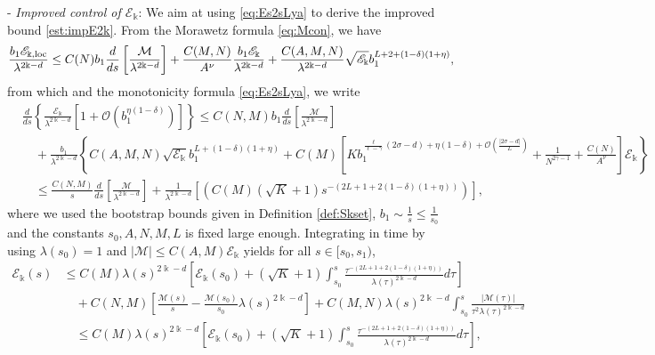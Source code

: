 \documentclass[11pt]{aims}
\theoremstyle{definition}
\numberwithin{equation}{section}
\begin{document}
\noindent - \textit{Improved control of ${\mathscr{E}}_{\Bbbk}$}: We aim at using \eqref{eq:Es2sLya} to derive the improved bound \eqref{est:impE2k}. From the Morawetz formula \eqref{eq:Mcon}, we have 
$$\frac{b_1 {\mathscr{E}}_{\Bbbk, \textup{loc}}}{\lambda^{2\Bbbk - d}} \leq C(N)b_1 \frac{d}{ds}\left[\frac{\mathcal{M}}{\lambda^{2\Bbbk - d}}\right] + \frac{C(M,N)}{A^\nu}\frac{b_1{\mathscr{E}}_\Bbbk}{\lambda^{2\Bbbk - d}} + \frac{C(A, M, N)}{\lambda^{2\Bbbk - d}} \sqrt{{\mathscr{E}}_\Bbbk}b_1^{L + 2 + (1 - \delta)(1 + \eta)},$$
from which and the monotonicity formula \eqref{eq:Es2sLya}, we write
\begin{align*}
&\frac{d}{ds} \left\{\frac{{\mathscr{E}}_\Bbbk}{\lambda^{2\Bbbk - d}} \left[1 + {\mathcal{O}}(b_1^{\eta(1 - \delta)})\right]\right\} \leq C(N,M)b_1 \frac{d}{ds}\left[\frac{\mathcal{M}}{\lambda^{2\Bbbk - d}}\right]\\
&\quad + \frac{b_1}{\lambda^{2\Bbbk - d}}\left\{C(A, M, N)\sqrt{{\mathscr{E}}_\Bbbk} b_1^{L + (1 - \delta)(1 + \eta)} + C(M) \left[K b_1^{\frac{\ell}{\ell - \gamma}(2\sigma - d) + \eta(1 - \delta) + {\mathcal{O}}\left(\frac{|2\sigma  - d|}{L}\right)} + \frac{1}{N^{2\gamma - 1}} + \frac{C(N)}{A^\nu} \right]{\mathscr{E}}_\Bbbk \right\} \\
& \quad \leq \frac{C(N,M)}{s} \frac{d}{ds}\left[\frac{\mathcal{M}}{\lambda^{2\Bbbk - d}}\right] + \frac{1}{\lambda^{2\Bbbk - d}} \left[ \left(C(M)(\sqrt{K} + 1)s^{-(2L  +1 + 2(1 - \delta)(1 + \eta))} \right) \right],
\end{align*}
where we used the bootstrap bounds given in Definition \ref{def:Skset}, $b_1 \sim \frac{1}{s} \leq \frac{1}{s_0}$ and the constants $s_0, A, N, M, L$ is fixed large enough. Integrating in time by using $\lambda(s_0) = 1$ and $|{\mathcal{M}}| \leq C(A,M){\mathscr{E}}_\Bbbk$ yields for all $s \in [s_0, s_1)$,
\begin{align*}
{\mathscr{E}}_{\Bbbk}(s) &\leq C(M) \lambda(s)^{2\Bbbk - d}\left[{\mathscr{E}}_{\Bbbk}(s_0) + \left(\sqrt K +  1\right)\int_{s_0}^s\frac{\tau^{-(2L + 1 + 2(1 - \delta)(1 + \eta))}}{\lambda(\tau)^{2\Bbbk - d}}d\tau\right]\\
& \quad + C(N,M)\left[\frac{{\mathcal{M}}(s)}{s} - \frac{{\mathcal{M}}(s_0)}{s_0} \lambda(s)^{2\Bbbk - d} \right] + C(M,N)\lambda(s)^{2\Bbbk - d}\int_{s_0}^s \frac{|{\mathcal{M}}(\tau)|}{\tau^2 \lambda(\tau)^{2\Bbbk - d}}\\
& \quad \leq  C(M) \lambda(s)^{2\Bbbk - d}\left[{\mathscr{E}}_{\Bbbk}(s_0) + \left(\sqrt K +  1\right)\int_{s_0}^s\frac{\tau^{-(2L + 1 + 2(1 - \delta)(1 + \eta))}}{\lambda(\tau)^{2\Bbbk - d}}d\tau\right],
\end{align*}
\end{document}
